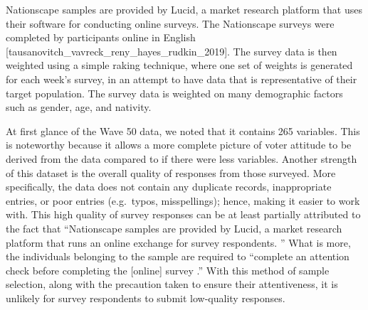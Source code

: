 \documentclass[
]{article}
\begin{document}
Nationscape samples are provided by Lucid, a market research platform that uses their software for conducting online surveys. The Nationscape surveys were completed by participants online in English {[}tausanovitch\_vavreck\_reny\_hayes\_rudkin\_2019{]}. The survey data is then weighted using a simple raking technique, where one set of weights is generated for each week's survey, in an attempt to have data that is representative of their target population. The survey data is weighted on many demographic factors such as gender, age, and nativity.

At first glance of the Wave 50 data, we noted that it contains 265 variables. This is noteworthy because it allows a more complete picture of voter attitude to be derived from the data compared to if there were less variables. Another strength of this dataset is the overall quality of responses from those surveyed. More specifically, the data does not contain any duplicate records, inappropriate entries, or poor entries (e.g.~typos, misspellings); hence, making it easier to work with. This high quality of survey responses can be at least partially attributed to the fact that ``Nationscape samples are provided by Lucid, a market research platform that runs an online exchange for survey respondents. \citep{tausanovitch_vavreck_reny_hayes_rudkin_2019}'' What is more, the individuals belonging to the sample are required to ``complete an attention check before completing the {[}online{]} survey \citep{tausanovitch_vavreck_reny_hayes_rudkin_2019}.'' With this method of sample selection, along with the precaution taken to ensure their attentiveness, it is unlikely for survey respondents to submit low-quality responses.
\end{document}
